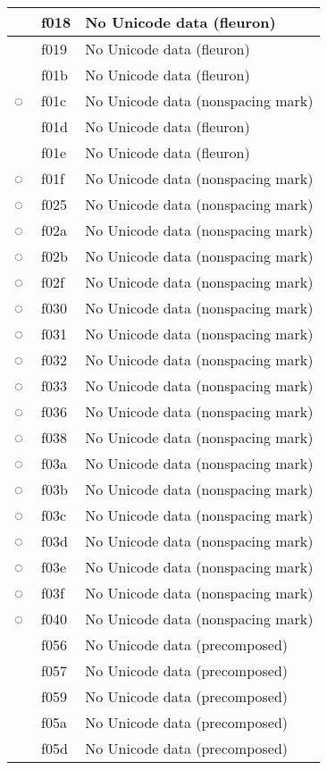 \documentclass[12pt,letterpaper,openany]{book}
\begin{document}
\begin{center}
\begin{supertabular}{|m{0.25in}|m{0.5in}|m{4in}|}
 & f018 & No Unicode data (fleuron)\\\hline
 & f019 & No Unicode data (fleuron)\\\hline
 & f01b & No Unicode data (fleuron)\\\hline
◌ & f01c & No Unicode data (nonspacing mark)\\\hline
 & f01d & No Unicode data (fleuron)\\\hline
 & f01e & No Unicode data (fleuron)\\\hline
◌ & f01f & No Unicode data (nonspacing mark)\\\hline
◌ & f025 & No Unicode data (nonspacing mark)\\\hline
◌ & f02a & No Unicode data (nonspacing mark)\\\hline
◌ & f02b & No Unicode data (nonspacing mark)\\\hline
◌ & f02f & No Unicode data (nonspacing mark)\\\hline
◌ & f030 & No Unicode data (nonspacing mark)\\\hline
◌ & f031 & No Unicode data (nonspacing mark)\\\hline
◌ & f032 & No Unicode data (nonspacing mark)\\\hline
◌ & f033 & No Unicode data (nonspacing mark)\\\hline
◌ & f036 & No Unicode data (nonspacing mark)\\\hline
◌ & f038 & No Unicode data (nonspacing mark)\\\hline
◌ & f03a & No Unicode data (nonspacing mark)\\\hline
◌ & f03b & No Unicode data (nonspacing mark)\\\hline
◌ & f03c & No Unicode data (nonspacing mark)\\\hline
◌ & f03d & No Unicode data (nonspacing mark)\\\hline
◌ & f03e & No Unicode data (nonspacing mark)\\\hline
◌ & f03f & No Unicode data (nonspacing mark)\\\hline
◌ & f040 & No Unicode data (nonspacing mark)\\\hline
 & f056 & No Unicode data (precomposed)\\\hline
 & f057 & No Unicode data (precomposed)\\\hline
 & f059 & No Unicode data (precomposed)\\\hline
 & f05a & No Unicode data (precomposed)\\\hline
 & f05d & No Unicode data (precomposed)\\\hline

\end{supertabular}
\end{center}
\end{document}
